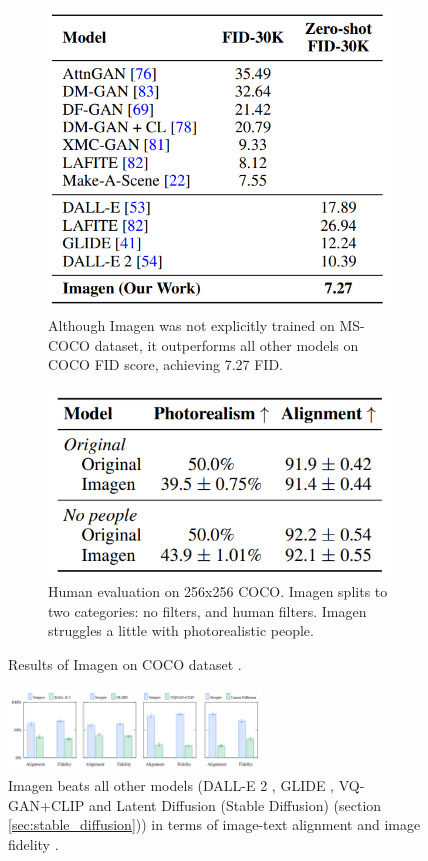 \begin{figure}[t!]
    \centering
    \begin{subfigure}{0.4\textwidth}
        \centering
        \includegraphics[width=0.6\linewidth]{images/imagen/imagen_coco_zeroshot.png}
        \caption{Although Imagen was not explicitly trained on MS-COCO dataset, it outperforms all other models on COCO FID score, achieving 7.27 FID.}
        \label{fig:imagen_coco_zeroshot}
    \end{subfigure}
    \begin{subfigure}{0.4\textwidth}
        \centering
        \includegraphics[width=0.6\linewidth]{images/imagen/imagen_coco_human_eval.png}
        \caption{Human evaluation on 256x256 COCO. Imagen splits to two categories: no filters, and human filters. Imagen struggles a little with photorealistic people.}
        \label{fig:imagen_coco_human_eval}
    \end{subfigure}
    \caption{Results of Imagen on COCO dataset \cite{imagen}.}
\end{figure}

\begin{figure}
    \centering
    \includegraphics[width=0.6\textwidth]{images/imagen/alignment_fidelity_imagen_vs_models.png}
    \caption{Imagen beats all other models (DALL-E 2 \cite{dalle_2}, GLIDE \cite{glide}, VQ-GAN+CLIP \cite{vqgan_clip} and Latent Diffusion (Stable Diffusion) \cite{stable_diffusion} (section \ref{sec:stable_diffusion})) in terms of image-text alignment and image fidelity \cite{imagen}.}
    \label{fig:imagen_alignment_fidelity_vs_other_models}
\end{figure}

